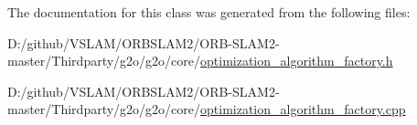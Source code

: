 The documentation for this class was generated from the following files\+:\begin{DoxyCompactItemize}
\item 
D\+:/github/\+V\+S\+L\+A\+M/\+O\+R\+B\+S\+L\+A\+M2/\+O\+R\+B-\/\+S\+L\+A\+M2-\/master/\+Thirdparty/g2o/g2o/core/\mbox{\hyperlink{optimization__algorithm__factory_8h}{optimization\+\_\+algorithm\+\_\+factory.\+h}}\item 
D\+:/github/\+V\+S\+L\+A\+M/\+O\+R\+B\+S\+L\+A\+M2/\+O\+R\+B-\/\+S\+L\+A\+M2-\/master/\+Thirdparty/g2o/g2o/core/\mbox{\hyperlink{optimization__algorithm__factory_8cpp}{optimization\+\_\+algorithm\+\_\+factory.\+cpp}}\end{DoxyCompactItemize}
